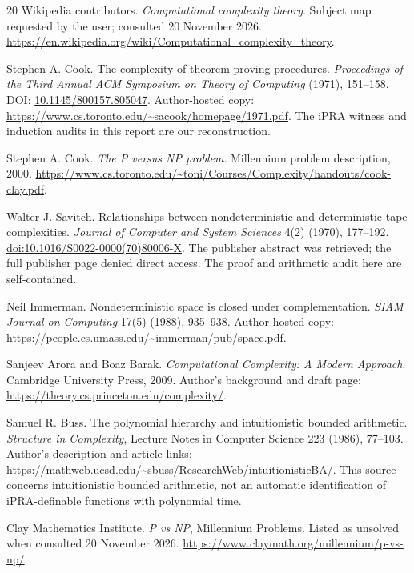 \begin{thebibliography}{20}
Wikipedia contributors. \emph{Computational complexity theory}.
Subject map requested by the user; consulted 20 November 2026.
\url{https://en.wikipedia.org/wiki/Computational_complexity_theory}.

Stephen A. Cook. The complexity of theorem-proving procedures.
\emph{Proceedings of the Third Annual ACM Symposium on Theory of Computing}
(1971), 151--158. DOI: \href{https://doi.org/10.1145/800157.805047}{10.1145/800157.805047}.
Author-hosted copy:
\url{https://www.cs.toronto.edu/~sacook/homepage/1971.pdf}.
The iPRA witness and induction audits in this report are our reconstruction.

Stephen A. Cook. \emph{The P versus NP problem}. Millennium problem
description, 2000.
\url{https://www.cs.toronto.edu/~toni/Courses/Complexity/handouts/cook-clay.pdf}.

Walter J. Savitch. Relationships between nondeterministic and deterministic
tape complexities. \emph{Journal of Computer and System Sciences}
4(2) (1970), 177--192.
\href{https://doi.org/10.1016/S0022-0000(70)80006-X}{doi:10.1016/S0022-0000(70)80006-X}.
The publisher abstract was retrieved; the full publisher page denied direct
access. The proof and arithmetic audit here are self-contained.

Neil Immerman. Nondeterministic space is closed under complementation.
\emph{SIAM Journal on Computing} 17(5) (1988), 935--938.
Author-hosted copy: \url{https://people.cs.umass.edu/~immerman/pub/space.pdf}.

Sanjeev Arora and Boaz Barak. \emph{Computational Complexity: A Modern
Approach}. Cambridge University Press, 2009.
Author's background and draft page:
\url{https://theory.cs.princeton.edu/complexity/}.

Samuel R. Buss. The polynomial hierarchy and intuitionistic bounded
arithmetic. \emph{Structure in Complexity}, Lecture Notes in Computer
Science 223 (1986), 77--103.
Author's description and article links:
\url{https://mathweb.ucsd.edu/~sbuss/ResearchWeb/intuitionisticBA/}.
This source concerns intuitionistic bounded arithmetic, not an automatic
identification of iPRA-definable functions with polynomial time.

Clay Mathematics Institute. \emph{P vs NP}, Millennium Problems.
Listed as unsolved when consulted 20 November 2026.
\url{https://www.claymath.org/millennium/p-vs-np/}.


\end{thebibliography}
